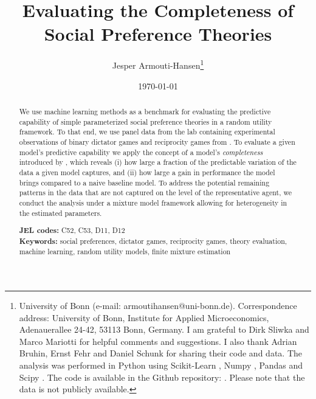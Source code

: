 \documentclass[11pt,a4paper]{article}
\theoremstyle{definition}
\begin{document}
\title{\vspace{-2cm}\large \textbf{Evaluating the Completeness of Social Preference Theories}}
\author{Jesper Armouti-Hansen\thanks{University of Bonn (e-mail: armoutihansen@uni-bonn.de). Correspondence address: University of Bonn, Institute for Applied Microeconomics, Adenauerallee 24-42, 53113 Bonn, Germany. I am grateful to Dirk Sliwka and Marco Mariotti for helpful comments and suggestions. I also thank Adrian Bruhin, Ernst Fehr and Daniel Schunk for sharing their code and data. The analysis was performed in Python using Scikit-Learn \citep{Pedregosa2011}, Numpy \citep{Harris2020}, Pandas \citep{Mckinney2010} and Scipy \citep{Virtanen2020}. The code is available in the Github repository: . Please note that the data is not publicly available.}}
\date{\today}
\maketitle
\begin{abstract}
 We use machine learning methods as a benchmark for evaluating the predictive capability of simple parameterized social preference theories in a random utility framework. To that end, we use panel data from the lab containing experimental observations of binary dictator games and reciprocity games from \cite{Bruhin2019}. To evaluate a given model's predictive capability we apply the concept of a model's \emph{completeness} introduced by \cite{Fudenberg2021b}, which reveals (i) how large a fraction of the predictable variation of the data a given model captures, and (ii) how large a gain in performance the model brings compared to a naive baseline model.  To address the potential remaining patterns in the data that are not captured on the level of the representative agent,  we conduct the analysis under a mixture model framework allowing for heterogeneity in the estimated parameters.

\textbf{JEL codes:} C52, C53, D11, D12\\
\textbf{Keywords:} social preferences, dictator games, reciprocity games, theory evaluation, machine learning, random utility models, finite mixture estimation
\end{abstract}
\end{document}
